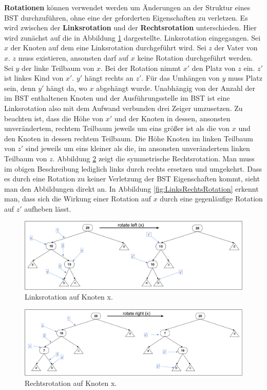 \documentclass[a4paper,12pt]{article}
\begin{document}
\noindent\textbf{Rotationen} können verwendet werden um Änderungen an der Struktur eines BST durchzuführen, ohne eine der geforderten Eigenschaften zu verletzen. Es wird zwischen der \textbf{Linksrotation} und der \textbf{Rechtsrotation }
unterschieden. Hier wird zunächst auf die in Abbildung \ref{fig:Linksrotation} dargestellte. Linksrotation eingegangen. 
Sei $x$ der Knoten auf dem eine Linksrotation durchgeführt wird. Sei $z$ der Vater von $x$. $z$ muss existieren, ansonsten darf auf $x$ keine Rotation durchgeführt werden. Sei $y$ der linke Teilbaum von $x$. Bei der Rotation nimmt $x'$ den Platz von $z$ ein. $z'$ ist linkes Kind von $x'$. $y'$ hängt rechts an $z'$. Für das Umhängen von $y$ muss Platz sein, denn $y'$ hängt da, wo $x$ abgehängt wurde. Unabhängig von der Anzahl der im BST enthaltenen Knoten und der Ausführungsstelle im BST ist eine Linksrotation also mit dem Aufwand verbunden drei Zeiger umzusetzen. Zu beachten ist, dass die Höhe von $x'$ und der Knoten in dessen, ansonsten unverändertem, rechtem Teilbaum jeweils um eins größer ist als die von $x$ und den Knoten in dessen rechtem Teilbaum. Die Höhe Knoten im linken Teilbaum von $z'$ sind jeweils um eins kleiner als die, im ansonsten unverändertem linken Teilbaum von $z$. 
 Abbildung \ref{fig:Rechtsrotation} zeigt die symmetrische Rechtsrotation. Man muss im obigen Beschreibung lediglich links durch rechts ersetzen und umgekehrt. Dass es durch eine Rotation zu keiner Verletzung der BST Eigenschaften kommt, sieht man den Abbildungen direkt an. In Abbildung \ref{fig:LinksRechtsRotation} erkennt man, dass sich die Wirkung einer Rotation auf $x$ durch eine gegenläufige Rotation auf $z'$ aufheben lässt.  
\begin{figure}[h]
	\centering
	\includegraphics[width= 1.2\textwidth]{"Medien/Einleitung/Linksrotation"}
	\caption{Linksrotation auf Knoten x. }
	\label{fig:Linksrotation}
\end{figure}
\begin{figure}[h]
	\centering
	\includegraphics[width= 1.2\textwidth]{"Medien/Einleitung/Rechtsrotation"}
	\caption{Rechtsrotation auf Knoten x. }
	\label{fig:Rechtsrotation}
\end{figure}
\end{document}

